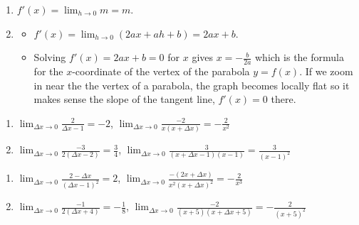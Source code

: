 \documentclass{ximera}
\begin{document}
\begin{enumerate}
\setcounter{enumi}{\value{HW}}

\item  $f'(x) = \lim_{h \rightarrow 0} m= m$.

\item  \begin{itemize} \item  $f'(x) = \lim_{h \rightarrow 0} (2ax + ah + b) = 2ax + b$.

\smallskip

\item  Solving $f'(x) = 2ax + b = 0$ for $x$ gives $x = -\frac{b}{2a}$ which is the formula for the $x$-coordinate of the vertex of the parabola $y = f(x)$.  If we zoom in near the the vertex of a parabola, the graph becomes locally flat so it makes sense the slope of the tangent line,  $f'(x) = 0$ there. 

\end{itemize} 

\setcounter{HW}{\value{enumi}}
\end{enumerate}

\begin{enumerate}
\setcounter{enumi}{\value{HW}}

\item  $\lim_{\Delta x \rightarrow 0} \frac{2}{\Delta x-1} = -2$,   $\lim_{\Delta x \rightarrow 0} \frac{-2}{x(x+\Delta x)} = - \frac{2}{x^2}$
 
\item  $\lim_{\Delta x \rightarrow 0} \frac{-3}{2(\Delta x - 2)} = \frac{3}{4}$,   $\lim_{\Delta x \rightarrow 0} \frac{3}{(x+\Delta x-1)(x-1)} =  \frac{3}{(x-1)^2}$  

\setcounter{HW}{\value{enumi}}
\end{enumerate}

\begin{enumerate}
\setcounter{enumi}{\value{HW}}

\item   $\lim_{\Delta x \rightarrow 0} \frac{2-\Delta x}{(\Delta x - 1)^2} =2$,   $\lim_{\Delta x \rightarrow 0}\frac{-(2x+\Delta x)}{x^2(x+\Delta x)^2} =  - \frac{2}{x^3}$   

\item    $\lim_{\Delta x \rightarrow 0} \frac{-1}{2(\Delta x+4)} = - \frac{1}{8}$,   $\lim_{\Delta x \rightarrow 0} \frac{-2}{(x+5)(x+\Delta x+5)}=  - \frac{2}{(x+5)^2}$    

\setcounter{HW}{\value{enumi}}
\end{enumerate}
\end{document}
